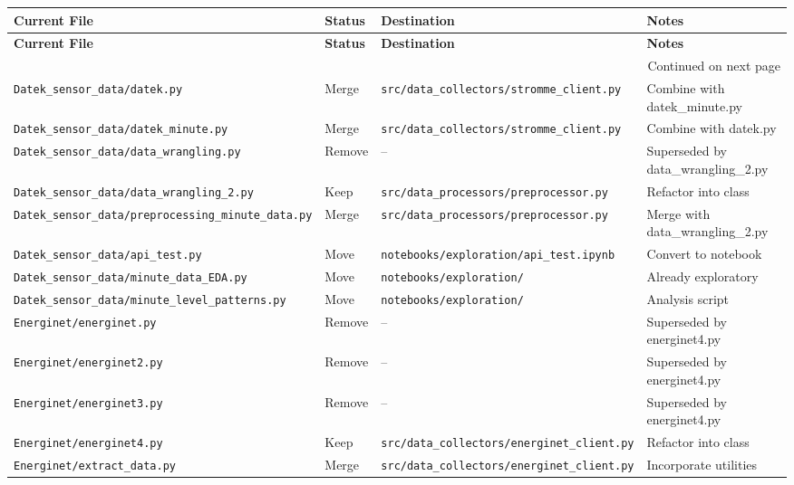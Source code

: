 \documentclass[11pt,a4paper]{article}
\begin{document}
\begin{longtable}{p{4cm} p{2cm} p{4.5cm} p{4cm}}
\toprule
\textbf{Current File} & \textbf{Status} & \textbf{Destination} & \textbf{Notes} \\
\midrule
\endfirsthead

\toprule
\textbf{Current File} & \textbf{Status} & \textbf{Destination} & \textbf{Notes} \\
\midrule
\endhead

\midrule
\multicolumn{4}{r}{{Continued on next page}} \\
\midrule
\endfoot

\bottomrule
\endlastfoot

\texttt{Datek\_sensor\_data/datek.py} & Merge & \texttt{src/data\_collectors/stromme\_client.py} & Combine with datek\_minute.py \\
\texttt{Datek\_sensor\_data/datek\_minute.py} & Merge & \texttt{src/data\_collectors/stromme\_client.py} & Combine with datek.py \\
\texttt{Datek\_sensor\_data/data\_wrangling.py} & Remove & -- & Superseded by data\_wrangling\_2.py \\
\texttt{Datek\_sensor\_data/data\_wrangling\_2.py} & Keep & \texttt{src/data\_processors/preprocessor.py} & Refactor into class \\
\texttt{Datek\_sensor\_data/preprocessing\_minute\_data.py} & Merge & \texttt{src/data\_processors/preprocessor.py} & Merge with data\_wrangling\_2.py \\
\texttt{Datek\_sensor\_data/api\_test.py} & Move & \texttt{notebooks/exploration/api\_test.ipynb} & Convert to notebook \\
\texttt{Datek\_sensor\_data/minute\_data\_EDA.py} & Move & \texttt{notebooks/exploration/} & Already exploratory \\
\texttt{Datek\_sensor\_data/minute\_level\_patterns.py} & Move & \texttt{notebooks/exploration/} & Analysis script \\
\texttt{Energinet/energinet.py} & Remove & -- & Superseded by energinet4.py \\
\texttt{Energinet/energinet2.py} & Remove & -- & Superseded by energinet4.py \\
\texttt{Energinet/energinet3.py} & Remove & -- & Superseded by energinet4.py \\
\texttt{Energinet/energinet4.py} & Keep & \texttt{src/data\_collectors/energinet\_client.py} & Refactor into class \\
\texttt{Energinet/extract\_data.py} & Merge & \texttt{src/data\_collectors/energinet\_client.py} & Incorporate utilities \\

\end{longtable}
\end{document}
